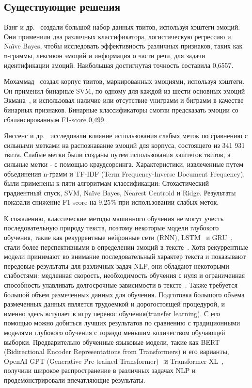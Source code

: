 \documentclass{article}
\begin{document}
\subsection{Существующие решения}


Ванг и др.~\cite{wang} создали большой набор данных твитов, используя хэштеги эмоций. Они применили два различных классификатора, логистическую регрессию и Naïve Bayes, чтобы исследовать эффективность различных признаков, таких как n-граммы, лексикон эмоций и информация о части речи, для задачи идентификации эмоций. Наибольшая достигнутая точность составила 0,6557.


Мохаммад~\cite{mohammad} создал корпус твитов, маркированных эмоциями, используя хэштеги. Он применил бинарные SVM, по одному для каждой из шести основных эмоций Экмана~\cite{ekman}, и использовал наличие или отсутствие униграмм и биграмм в качестве бинарных признаков. Бинарные классификаторы смогли предсказать эмоции со сбалансированным F1-score 0,499.


Янссенс и др.~\cite{janssens} исследовали влияние использования слабых меток по сравнению с сильными метками на распознавание эмоций для корпуса, состоящего из 341 931 твита. Слабые метки были созданы путем использования хэштегов твитов, а сильные метки - с помощью краудсорсинга. Характеристики, извлеченные путем объединения n-грамм и TF-IDF (Term Frequency-Inverse Document Frequency), были применены к пяти алгоритмам классификации: Стохастический градиентный спуск, SVM, Naïve Bayes, Nearest Centroid и Ridge. Результаты показали снижение F1-score на 9,25\% при использовании слабых меток.

К сожалению, классические методы машинного обучения не могут учесть последовательную природу текста, поэтому некоторые модели глубокого обучения, такие как рекуррентные нейронные сети (RNN), LSTM~\cite{hochreiter1} и GRU~\cite{cho}, стали более перспективными в определении эмоций в тексте~\cite{kratzwald, chatterjee, xu}. Хотя рекуррентные модели принимают во внимание последовательный характер текста и показывают передовые результаты для различных задач NLP, они обладают некоторыми слабостями: медленная скорость, необходимость обучения с нуля и ограниченная способность улавливать долгосрочные зависимости в тексте~\cite{hochreiter2}. Также требуется большой объем размеченных данных для обучения. Подготовка большого объема размеченных данных является трудоемкой и дорогостоящей процедурой, и именно здесь вступает в игру перенос обучения(transfer learning). С его помощью можно добиться лучших результатов по сравнению с традиционными моделями глубокого обучения с гораздо меньшим количеством обучающей выборки. Предварительно обученные языковые модели, такие как BERT~\cite{devlin} (Bidirectional Encoder Representations from Transformers) и его варианты, OpenAI GPT (Generative Pre-trained Transformer)~\cite{radford} и Transformer-XL~\cite{dai}, получили широкое распространение в различных задачах NLP и продемонстрировали впечатляющие результаты.
\end{document}
